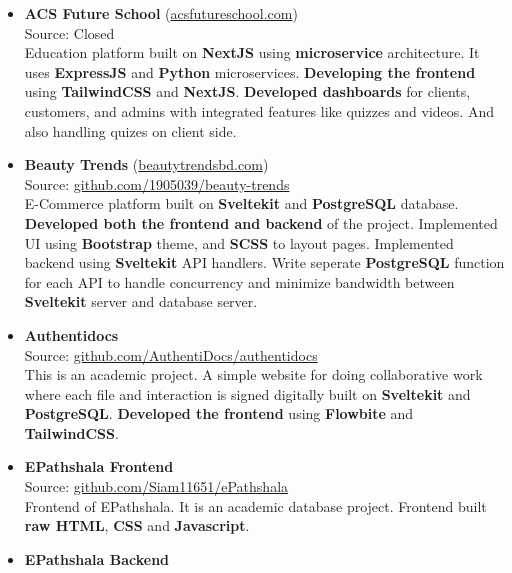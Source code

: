 
\begin{itemize}
  \item {
    \textbf{ACS Future School} (\href{https://www.acsfutureschool.com}{acsfutureschool.com}) \\
    Source: Closed \\
    Education platform built on \textbf{NextJS} using \textbf{microservice} architecture. It uses \textbf{ExpressJS} and \textbf{Python} microservices. \textbf{Developing the frontend} using \textbf{TailwindCSS} and \textbf{NextJS}. \textbf{Developed dashboards} for clients, customers, and admins with integrated features like quizzes and videos. And also handling quizes on client side.
  }
  \item {
    \textbf{Beauty Trends} (\href{https://www.beautytrendsbd.com}{beautytrendsbd.com}) \\
    Source: \href{https://github.com/1905039/beauty-trends}{github.com/1905039/beauty-trends} \\
    E-Commerce platform built on \textbf{Sveltekit} and \textbf{PostgreSQL} database. \textbf{Developed both the frontend and backend} of the project. Implemented UI using \textbf{Bootstrap} theme, and \textbf{SCSS} to layout pages. Implemented backend using \textbf{Sveltekit} API handlers. Write seperate \textbf{PostgreSQL} function for each API to handle concurrency and minimize bandwidth between \textbf{Sveltekit} server and database server.
  }
  \item {
      \textbf{Authentidocs} \\
      Source: \href{https://github.com/AuthentiDocs/authentidocs}{github.com/AuthentiDocs/authentidocs} \\
      This is an academic project. A simple website for doing collaborative work where each file and interaction is signed digitally built on \textbf{Sveltekit} and \textbf{PostgreSQL}. \textbf{Developed the frontend} using \textbf{Flowbite} and \textbf{TailwindCSS}.
    }
  \item {
    \textbf{EPathshala Frontend} \\
    Source: \href{https://github.com/Siam11651/ePathshala}{github.com/Siam11651/ePathshala} \\
    Frontend of EPathshala. It is an academic database project. Frontend built \textbf{raw HTML}, \textbf{CSS} and \textbf{Javascript}.
  }
  \item {
    \textbf{EPathshala Backend} \\
}
\end{itemize}
